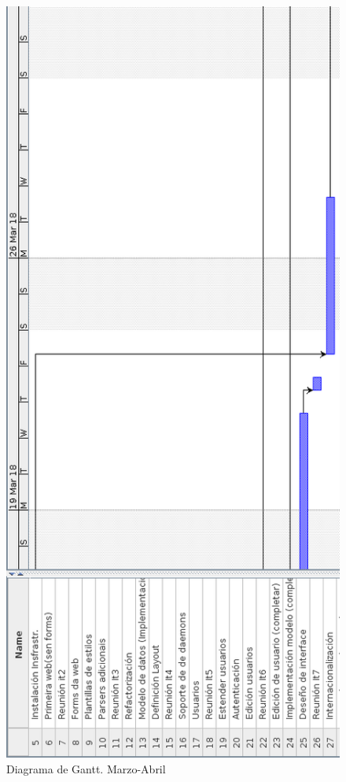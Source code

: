 \begin{figure}[H]
	\centering
	\includegraphics[scale=0.45,keepaspectratio=true]{./images/gantt/g7.png}
	\caption{Diagrama de Gantt. Marzo-Abril}
\end{figure}

